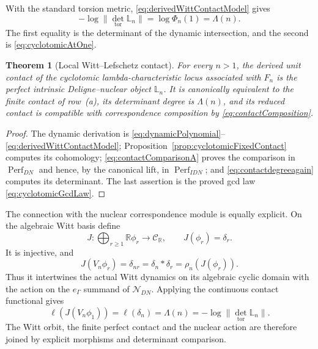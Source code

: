 \documentclass[11pt]{amsart}
\newtheorem{theorem}{Theorem}[section]
\theoremstyle{definition}
\theoremstyle{remark}
\newcommand{\R}{\mathbb R}
\begin{document}
With the standard torsion metric, \eqref{eq:derivedWittContactModel} gives
\begin{equation}\label{eq:contactdegreeagain}
 -\log\|\det_{\mathrm{tor}}\mathbb L_n\|
 =\log\Phi_n(1)=\Lambda(n).
\end{equation}
The first equality is the determinant of the dynamic intersection, and the
second is \eqref{eq:cyclotomicAtOne}.

\begin{theorem}[Local Witt--Lefschetz contact]\label{thm:rowbcontact}
For every $n>1$, the derived unit contact of the cyclotomic
lambda-characteristic locus associated with $F_n$ is
the perfect intrinsic Deligne--nuclear object $\mathbb L_n$.  It is canonically
equivalent to the finite contact of row~(a), its determinant degree is
$\Lambda(n)$, and its reduced contact is compatible with correspondence
composition by \eqref{eq:contactComposition}.
\end{theorem}

\begin{proof}
The dynamic derivation is
\eqref{eq:dynamicPolynomial}--\eqref{eq:derivedWittContactModel};
Proposition~\ref{prop:cyclotomicFixedContact} computes its cohomology;
\eqref{eq:contactComparisonA} proves the comparison in
$\operatorname{Perf}_{DN}$ and hence, by the canonical lift, in
$\operatorname{Perf}_{IDN}$; and \eqref{eq:contactdegreeagain} computes its
determinant.  The last assertion is the proved gcd law
\eqref{eq:cyclotomicGcdLaw}.
\end{proof}

The connection with the nuclear correspondence module is equally
explicit.  On the algebraic Witt basis define
\begin{equation}\label{eq:WittNuclearIntertwiner}
 J:\bigoplus_{r\geq1}\R\phi_r\longrightarrow\mathcal C_{\R},
 \qquad J(\phi_r)=\delta_r.
\end{equation}
It is injective, and
\begin{equation}\label{eq:WittNuclearIntertwining}
 J(V_n\phi_r)=\delta_{nr}=\delta_n*\delta_r
 =\rho_n(J(\phi_r)).
\end{equation}
Thus it intertwines the actual Witt dynamics on its algebraic cyclic domain
with the action on the $e_\Gamma$ summand of $\mathcal N_{DN}$.  Applying
the continuous contact functional gives
\begin{equation}\label{eq:nuclearContactComparison}
 \ell(J(V_n\phi_1))=\ell(\delta_n)=\Lambda(n)
 =-\log\|\det_{\mathrm{tor}}\mathbb L_n\|.
\end{equation}
The Witt orbit, the finite perfect contact and the nuclear action are
therefore joined by explicit morphisms and determinant comparison.
\end{document}
